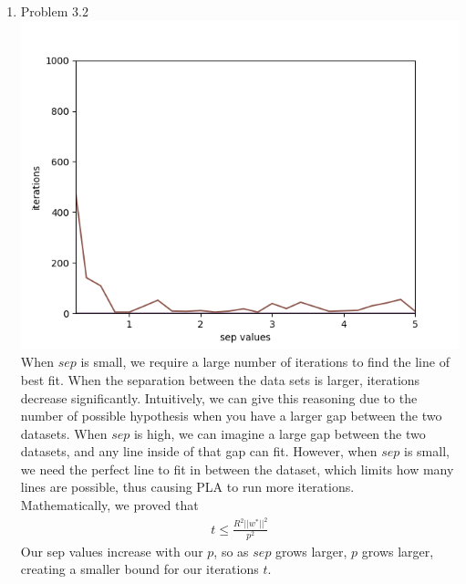 \documentclass{article}
\begin{document}
\begin{enumerate}
        \item Problem 3.2\\
        \includegraphics[scale=0.5]{images/p3_2.png}\\
        When $sep$ is small, we require a large number of iterations to find the line of best fit. When the separation between the data sets is larger, iterations decrease significantly. Intuitively, we can give this reasoning due to the number of possible hypothesis when you have a larger gap between the two datasets. When $sep$ is high, we can imagine a large gap between the two datasets, and any line inside of that gap can fit. However, when $sep$ is small, we need the perfect line to fit in between the dataset, which limits how many lines are possible, thus causing PLA to run more iterations.\\[0.25in]
        Mathematically, we proved that
        \begin{align*}
            t \leq \frac{R^2 ||w^*||^2}{p^2}
        \end{align*}
        Our sep values increase with our $p$, so as $sep$ grows larger, $p$ grows larger, creating a smaller bound for our iterations $t$.


\end{enumerate}
\end{document}
